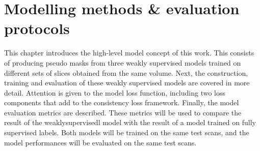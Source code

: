 


\chapter{Modelling methods \& evaluation protocols}\thispagestyle{empty}
\par{
    This chapter introduces the high-level model concept of this work.
    This consists of producing pseudo masks from three weakly supervised models trained on different sets of slices obtained from the same volume.
    Next, the construction, training and evaluation of these weakly supervised models are covered in more detail.
    Attention is given to the model loss function, including two loss components that add to the consistency loss framework\cite{Laradji2021}.
    Finally, the model evaluation metrics are described.
    These metrics will be used to compare the result of the \Gls{weaklysupervisedl} model with the result of a model trained on fully supervised labels.
    Both models will be trained on the same test scans, and the model performances will be evaluated on the same test scans.
}

\FloatBarrier




